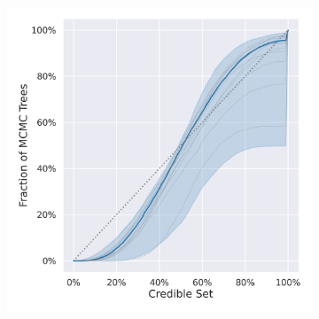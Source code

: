\documentclass[10pt,letterpaper]{article}
\begin{document}
\begin{figure}
	\caption{The credible-region plots for different datasets and distributions. The plot shows the fraction of MCMC trees contained in the smallest $\gamma$-credible region for different $\gamma$. The closer the resulting line is to the $x=y$ line the better. The blue line shows the median line for the datasets; 95 \% of all datasets fall into the blue region. The grey lines the credible-region plots for 10 random datasets.}
	
	\centering
	\begin{subfigure}[b]{0.4\textwidth}
		\centering
		\includegraphics[width=\textwidth]{figures/yule-200-ccd1-credible-sets-Height (LogNormal), Ratios (Beta).png}
	\end{subfigure}
	\begin{subfigure}[b]{0.4\textwidth}
		\centering

\end{subfigure}
\end{figure}
\end{document}
